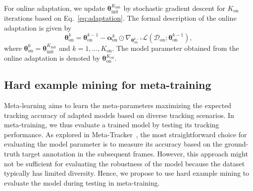 \documentclass[letterpaper]{article} %
\def \dataonline{\mathcal{D}_\text{on}}
\def \thetainitadapt{\boldsymbol{\theta}_\text{init}}
\def \thetaonlineadapt{\boldsymbol{\theta}_\text{on}}
\def \alphaonline{\boldsymbol{\alpha}_\text{on}}
\def \Kinit{K_\text{init}}
\def \Konline{K_\text{on}}
\begin{document}
For online adaptation, we update $\thetainitadapt^{\Kinit}$ by stochastic gradient descent for $\Konline$ iterations based on Eq.~\eqref{eq:adaptation}.
The formal description of the online adaptation is given by 
%
\begin{equation}
\thetaonlineadapt^k = \thetaonlineadapt^{k-1} - \alphaonline^k \odot \nabla_{\thetaonlineadapt^{k-1}}\mathcal{L}(\dataonline; \thetaonlineadapt^{k-1}),
\label{eq:weak_adaptation}
\end{equation}
%
where $\thetaonlineadapt^0 = \thetainitadapt^{\Kinit}$ and $k =1, \dots ,\Konline$.
The model parameter obtained from the online adaptation is denoted by $\thetaonlineadapt^{\Konline}$.

\subsection{Hard example mining for meta-training}

Meta-learning aims to learn the meta-parameters maximizing the expected tracking accuracy of adapted models based on diverse tracking scenarios.
In meta-training, we thus evaluate a trained model by testing its tracking performance. %
As explored in Meta-Tracker~\cite{park2018metatracker}, the most straightforward choice for evaluating the model parameter is to measure its accuracy based on the ground-truth target annotation in the subsequent frames.
However, this approach might not be sufficient for evaluating the robustness of the model because the dataset typically has limited diversity.
Hence, we propose to use hard example mining to evaluate the model during testing in meta-training.
\end{document}
